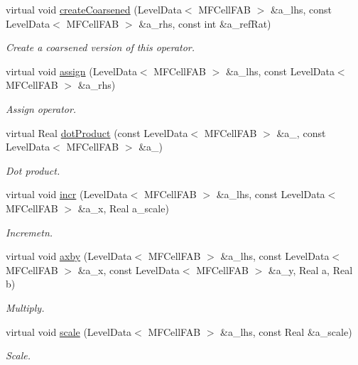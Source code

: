 \begin{DoxyCompactItemize}
virtual void \hyperlink{classnwomfconductivityop_ae8d0f4376c7ca6aaa354d73e45abe813}{create\+Coarsened} (Level\+Data$<$ M\+F\+Cell\+F\+AB $>$ \&a\+\_\+lhs, const Level\+Data$<$ M\+F\+Cell\+F\+AB $>$ \&a\+\_\+rhs, const int \&a\+\_\+ref\+Rat)
\begin{DoxyCompactList}\small\item\em Create a coarsened version of this operator. \end{DoxyCompactList}\item 
virtual void \hyperlink{classnwomfconductivityop_af846ef4b565e4ad591ef26f59d2b6787}{assign} (Level\+Data$<$ M\+F\+Cell\+F\+AB $>$ \&a\+\_\+lhs, const Level\+Data$<$ M\+F\+Cell\+F\+AB $>$ \&a\+\_\+rhs)
\begin{DoxyCompactList}\small\item\em Assign operator. \end{DoxyCompactList}\item 
virtual Real \hyperlink{classnwomfconductivityop_a344feaf9a38cfbd26ce9c37361b73fd3}{dot\+Product} (const Level\+Data$<$ M\+F\+Cell\+F\+AB $>$ \&a\+\_, const Level\+Data$<$ M\+F\+Cell\+F\+AB $>$ \&a\+\_)
\begin{DoxyCompactList}\small\item\em Dot product. \end{DoxyCompactList}\item 
virtual void \hyperlink{classnwomfconductivityop_a65fccfefed9880ac4b2859d8d9d6a626}{incr} (Level\+Data$<$ M\+F\+Cell\+F\+AB $>$ \&a\+\_\+lhs, const Level\+Data$<$ M\+F\+Cell\+F\+AB $>$ \&a\+\_\+x, Real a\+\_\+scale)
\begin{DoxyCompactList}\small\item\em Incremetn. \end{DoxyCompactList}\item 
virtual void \hyperlink{classnwomfconductivityop_a8880c69b8fcb491ebd3a4b75ce4c3b5b}{axby} (Level\+Data$<$ M\+F\+Cell\+F\+AB $>$ \&a\+\_\+lhs, const Level\+Data$<$ M\+F\+Cell\+F\+AB $>$ \&a\+\_\+x, const Level\+Data$<$ M\+F\+Cell\+F\+AB $>$ \&a\+\_\+y, Real a, Real b)
\begin{DoxyCompactList}\small\item\em Multiply. \end{DoxyCompactList}\item 
virtual void \hyperlink{classnwomfconductivityop_ae1f01e06961ccc7dd3e73c3da66efe11}{scale} (Level\+Data$<$ M\+F\+Cell\+F\+AB $>$ \&a\+\_\+lhs, const Real \&a\+\_\+scale)
\begin{DoxyCompactList}\small\item\em Scale. \end{DoxyCompactList}\item 

\end{DoxyCompactItemize}
